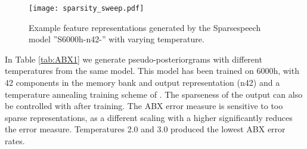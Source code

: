 \documentclass[a4paper]{article}
\begin{document}
\begin{figure}[t]
  \centering
  \texttt{[image: sparsity\_sweep.pdf]}
  \caption{Example feature representations generated by the Sparsespeech model ''S6000h-n42-'' with varying temperature.}
  \label{fig:sparseness}
\end{figure}

In Table \ref{tab:ABX1} we generate pseudo-posteriorgrams with different temperatures  from the same model. This model has been trained on 6000h, with 42 components in the memory bank and output representation (n42) and a temperature annealing training scheme of . The sparseness of the output can also be controlled with  after training. The ABX error measure is sensitive to too sparse representations, as a different scaling with a higher  significantly reduces the error measure. Temperatures 2.0 and 3.0 produced the lowest ABX error rates. 

\begin{table}[th]
  \caption{ABX error on features/posteriograms generated by our model for the Libri-Light dev set with different  (components in the memory bank).}
  \label{tab:ABX2}
  \centering
\end{table}
\end{document}

